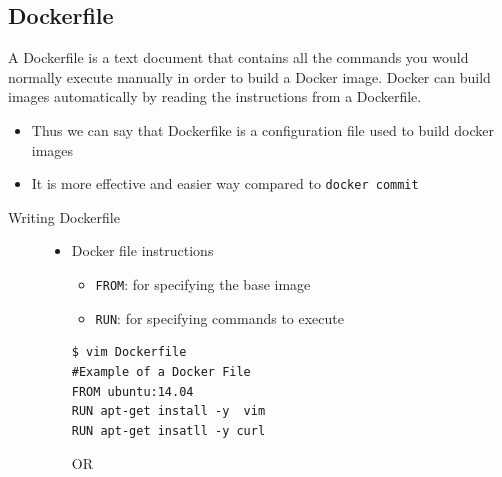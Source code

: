 \documentclass[11pt]{article}
\begin{document}
\subsection{Dockerfile}
\label{sec:orgheadline23}
A Dockerfile is a text document that contains all the commands you would
normally execute manually in order to build a Docker image. Docker can build
images automatically by reading the instructions from a Dockerfile.
\begin{itemize}
\item Thus we can say that Dockerfike is a configuration file used to build docker images
\item It is more effective and easier way compared to \texttt{docker commit}
\end{itemize}
\begin{description}
\item[{Writing Dockerfile}] \begin{itemize}
\item Docker file instructions
\begin{itemize}
\item \texttt{FROM}: for specifying the base image
\item \texttt{RUN}: for specifying commands to execute
\end{itemize}
\begin{verbatim}
$ vim Dockerfile 
#Example of a Docker File
FROM ubuntu:14.04
RUN apt-get install -y  vim
RUN apt-get insatll -y curl
\end{verbatim}

OR


\end{itemize}
\end{description}
\end{document}
